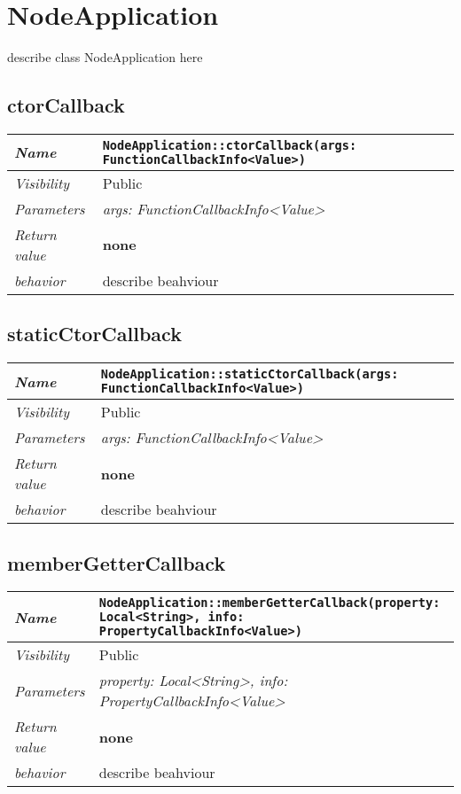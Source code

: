 \chapter{NodeApplication}
describe class NodeApplication here
\section{ctorCallback}
\begin{longtable}{p{3cm} @{\hskip 1cm} p{12cm}}
 \hline
\textit{Name} & \texttt{NodeApplication::ctorCallback(args: FunctionCallbackInfo<Value>)}\\
\hline
 \textit{Visibility} & Public \\
\hline
\textit{Parameters} & \textit{args: FunctionCallbackInfo<Value>}\\
\hline
\textit{Return value} & \textbf{none}\\
  \hline
 \textit{behavior} & describe beahviour \\
\hline
\end{longtable} \pagebreak
 \section{staticCtorCallback}
\begin{longtable}{p{3cm} @{\hskip 1cm} p{12cm}}
 \hline
\textit{Name} & \texttt{NodeApplication::staticCtorCallback(args: FunctionCallbackInfo<Value>)}\\
\hline
 \textit{Visibility} & Public \\
\hline
\textit{Parameters} & \textit{args: FunctionCallbackInfo<Value>}\\
\hline
\textit{Return value} & \textbf{none}\\
  \hline
 \textit{behavior} & describe beahviour \\
\hline
\end{longtable} \pagebreak
 \section{memberGetterCallback}
\begin{longtable}{p{3cm} @{\hskip 1cm} p{12cm}}
 \hline
\textit{Name} & \texttt{NodeApplication::memberGetterCallback(property: Local<String>, info: PropertyCallbackInfo<Value>)}\\
\hline
 \textit{Visibility} & Public \\
\hline
\textit{Parameters} & \textit{property: Local<String>, info: PropertyCallbackInfo<Value>}\\
\hline
\textit{Return value} & \textbf{none}\\
  \hline
 \textit{behavior} & describe beahviour \\
\hline
\end{longtable} \pagebreak
